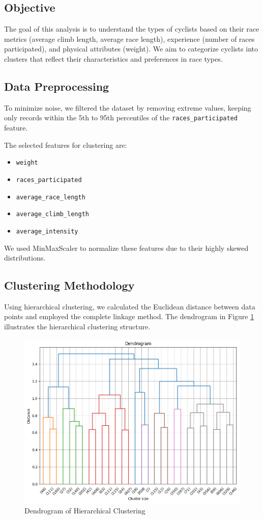 \documentclass{article}
\begin{document}
\subsection{Objective}
The goal of this analysis is to understand the types of cyclists based on their race metrics (average climb length, average race length), experience (number of races participated), and physical attributes (weight). We aim to categorize cyclists into clusters that reflect their characteristics and preferences in race types.

\subsection{Data Preprocessing}
To minimize noise, we filtered the dataset by removing extreme values, keeping only records within the 5th to 95th percentiles of the \texttt{races\_participated} feature.


The selected features for clustering are:
\begin{itemize}
    \item \texttt{weight}
    \item \texttt{races\_participated}
    \item \texttt{average\_race\_length}
    \item \texttt{average\_climb\_length}
    \item \texttt{average\_intensity}
\end{itemize}

We used MinMaxScaler to normalize these features due to their highly skewed distributions.

\subsection{Clustering Methodology}
Using hierarchical clustering, we calculated the Euclidean distance between data points and employed the complete linkage method. The dendrogram in Figure \ref{fig:dendrogram} illustrates the hierarchical clustering structure.

\begin{figure}[H]
    \centering
    \includegraphics[width=0.4\linewidth]{dend.png}
    \caption{Dendrogram of Hierarchical Clustering}
    \label{fig:dendrogram}
\end{figure}
\end{document}
